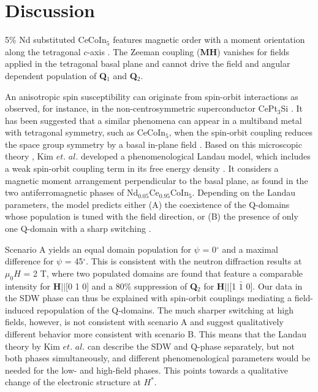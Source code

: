 \documentclass[article,twocolumn,showpacs,preprintnumbers,amsmath,amssymb, superscriptaddress]{revtex4-1}
\begin{document}
\section*{Discussion}

5\% Nd substituted CeCoIn$_5$ features magnetic order with a moment orientation along the tetragonal $c$-axis \cite{Mazzone2017}. The Zeeman coupling (\textbf{M}\textbf{H}) vanishes for fields applied in the tetragonal basal plane and cannot drive the field and angular dependent population of \textbf{Q}$_1$ and \textbf{Q}$_2$. 

An anisotropic spin susceptibility can originate from spin-orbit interactions as observed, for instance, in the non-centrosymmetric superconductor CePt$_3$Si \cite{Frigeri2004, Fak2014}. It has been suggested that a similar phenomena can appear in a multiband metal with tetragonal symmetry, such as CeCoIn$_5$, when the spin-orbit coupling reduces the space group symmetry by a basal in-plane field \cite{Mineev2016}. Based on this microscopic theory , Kim $et.$ $al.$ developed a phenomenological Landau model, which includes a weak spin-orbit coupling term in its free energy density \cite{Kim20172}. It considers a magnetic moment arrangement perpendicular to the basal plane, as found in the two antiferromagnetic phases of Nd$_{0.05}$Ce$_{0.95}$CoIn$_5$. Depending on the Landau parameters, the model predicts either (A) the coexistence of the Q-domains whose population is tuned with the field direction, or (B) the presence of only one Q-domain with a sharp switching \cite{Kim20172}. 

Scenario A yields an equal domain population for $\psi$ = 0$^\circ$ and a maximal difference for $\psi$ = 45$^\circ$. This is consistent with the neutron diffraction results at $\mu_0H$ = 2 T, where two populated domains are found that feature a comparable intensity for \textbf{H}$||$[0 1 0] and a 80\% suppression of \textbf{Q}$_2$ for \textbf{H}$||$[1 $\bar{1}$ 0]. Our data in the SDW phase can thus be explained with spin-orbit couplings mediating a field-induced repopulation of the Q-domains. The much sharper switching at high fields, however, is not consistent with scenario A and suggest qualitatively different behavior more consistent with scenario B. This means that the Landau theory by Kim $et.$ $al.$ \cite{Kim20172} can describe the SDW and Q-phase separately, but not both phases simultaneously, and different phenomenological parameters would be needed for the low- and high-field phases. This points towards a qualitative change of the electronic structure at $H^*$. 
\end{document}
